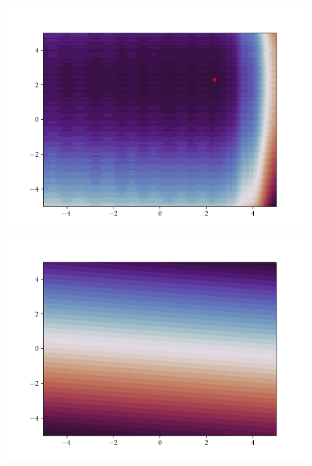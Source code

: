 \begin{figure}[h]
    \begin{minipage}[b]{0.32\textwidth}
      \includegraphics[trim=2.5cm 1.3cm 2.5cm 1.3cm,clip,width=\textwidth]{Figures/coco/f4.png}
    \end{minipage}
    \hfill
    \begin{minipage}[b]{0.32\textwidth}
      \includegraphics[trim=2.5cm 1.3cm 2.5cm 1.3cm,clip,width=\textwidth]{Figures/coco/f5.png}
    \end{minipage}
    \hfill
    \begin{minipage}[b]{0.32\textwidth}

\end{minipage}
\end{figure}
